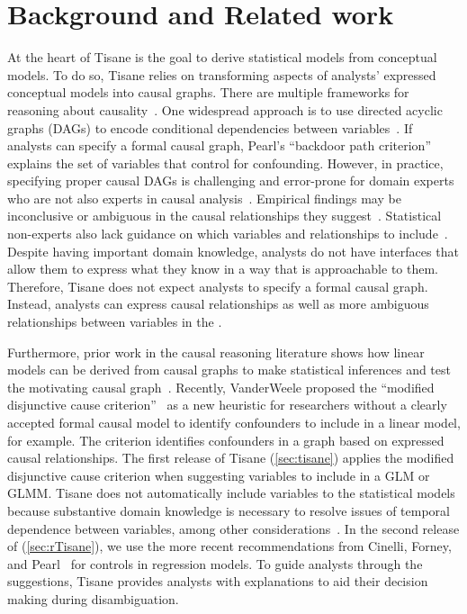 \section{Background and Related work} \label{sec:relatedWorkTisane}
At the heart of Tisane is the goal to derive statistical models from conceptual
models. To do so, Tisane relies on transforming aspects of analysts' expressed
conceptual models into causal graphs. There are multiple frameworks for
reasoning about causality~\cite{rubin2004teaching,pearl1995causal}. One
widespread approach is to use directed acyclic graphs (DAGs) to encode
conditional dependencies between
variables~\cite{pearl1995doCalculus,greenland1999causal,spirtes1994conditional,spirtes1996using}.
If analysts can specify a formal causal graph, Pearl's ``backdoor path
criterion''~\cite{pearl1995causal,pearl2000models} explains the set of variables
that control for confounding. However, in practice, specifying proper causal
DAGs is challenging and error-prone for domain experts who are not also experts
in causal analysis~\cite{suzuki2020causal}. Empirical findings may be
inconclusive or ambiguous in the causal relationships they
suggest~\cite{suzuki2018mechanisms}. Statistical non-experts also lack guidance
on which variables and relationships to include~\cite{velentgas2013developing}.
Despite having important domain knowledge, analysts do not have interfaces that
allow them to express what they know in a way that is approachable to them.
Therefore, Tisane does not expect analysts to specify a formal causal graph.
Instead, analysts can express causal relationships as well as more ambiguous
relationships between variables in the \SDSLlong.

Furthermore, prior work in the causal reasoning literature shows how linear
models can be derived from causal graphs to make statistical inferences and test
the motivating causal graph~\cite{spirtes1996using,spirtes1994conditional}.
Recently, VanderWeele proposed the ``modified disjunctive cause
criterion''~\cite{vanderweele2019modifiedDisjunctiveCriterion} as a new
heuristic for researchers without a clearly accepted formal causal model to
identify confounders to include in a linear model, for example. The criterion
identifies confounders in a graph based on expressed causal relationships. The
first release of Tisane (\autoref{sec:tisane}) applies the modified disjunctive
cause criterion when suggesting variables to include in a GLM or GLMM. Tisane
does not automatically include variables to the statistical models because
substantive domain knowledge is necessary to resolve issues of temporal
dependence between variables, among other
considerations~\cite{vanderweele2019modifiedDisjunctiveCriterion}. In the second
release of \tisane (\autoref{sec:rTisane}), we use the more recent
recommendations from Cinelli, Forney, and Pearl~\cite{cinelli2020controls} for
controls in regression models. To guide analysts through the suggestions, Tisane
provides analysts with explanations to aid their decision making during
disambiguation. 

